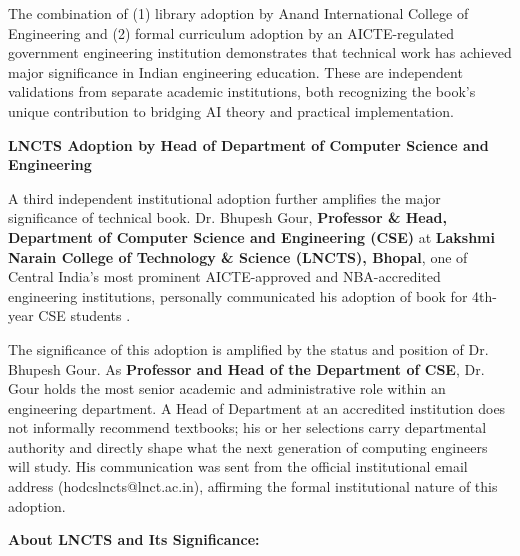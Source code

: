 The combination of (1) library adoption by Anand International College of Engineering and (2) formal curriculum adoption by an AICTE-regulated government engineering institution demonstrates that \drs technical work has achieved major significance in Indian engineering education. These are independent validations from separate academic institutions, both recognizing the book's unique contribution to bridging AI theory and practical implementation.

\textbf{LNCTS Adoption by Head of Department of Computer Science and Engineering}

A third independent institutional adoption further amplifies the major significance of \drs technical book. Dr. Bhupesh Gour, \textbf{Professor \& Head, Department of Computer Science and Engineering (CSE)} at \textbf{Lakshmi Narain College of Technology \& Science (LNCTS), Bhopal}, one of Central India's most prominent AICTE-approved and NBA-accredited engineering institutions, personally communicated his adoption of \drs book for 4th-year CSE students \cite{OR10}.

The significance of this adoption is amplified by the status and position of Dr. Bhupesh Gour. As \textbf{Professor and Head of the Department of CSE}, Dr. Gour holds the most senior academic and administrative role within an engineering department. A Head of Department at an accredited institution does not informally recommend textbooks; his or her selections carry departmental authority and directly shape what the next generation of computing engineers will study. His communication was sent from the official institutional email address (hodcslncts@lnct.ac.in), affirming the formal institutional nature of this adoption.

\textbf{About LNCTS and Its Significance:}

